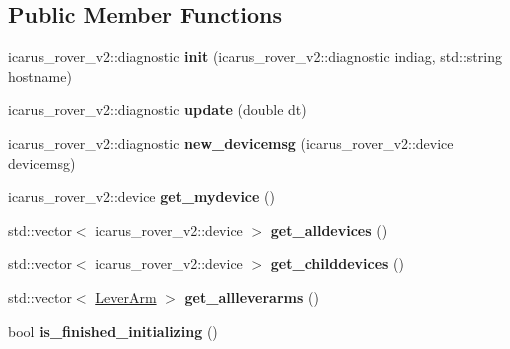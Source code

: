 \subsection*{Public Member Functions}
\begin{DoxyCompactItemize}
\item 
\mbox{\label{classMasterNodeProcess_aa928b2c648d13b4faed375cc15dfc652}} 
icarus\+\_\+rover\+\_\+v2\+::diagnostic {\bfseries init} (icarus\+\_\+rover\+\_\+v2\+::diagnostic indiag, std\+::string hostname)
\item 
\mbox{\label{classMasterNodeProcess_a19cc0bcaddc79b7460ea8944c00f7209}} 
icarus\+\_\+rover\+\_\+v2\+::diagnostic {\bfseries update} (double dt)
\item 
\mbox{\label{classMasterNodeProcess_a6acb9fe8a0baba49a5069e13aba2e373}} 
icarus\+\_\+rover\+\_\+v2\+::diagnostic {\bfseries new\+\_\+devicemsg} (icarus\+\_\+rover\+\_\+v2\+::device devicemsg)
\item 
\mbox{\label{classMasterNodeProcess_adf00ae56ad84a1a8995ab87eaf77da20}} 
icarus\+\_\+rover\+\_\+v2\+::device {\bfseries get\+\_\+mydevice} ()
\item 
\mbox{\label{classMasterNodeProcess_a7e8a12f60c1f8e974abb502d35f94fd0}} 
std\+::vector$<$ icarus\+\_\+rover\+\_\+v2\+::device $>$ {\bfseries get\+\_\+alldevices} ()
\item 
\mbox{\label{classMasterNodeProcess_a971e1d3bdf38bb61a7d57da697222b2c}} 
std\+::vector$<$ icarus\+\_\+rover\+\_\+v2\+::device $>$ {\bfseries get\+\_\+childdevices} ()
\item 
\mbox{\label{classMasterNodeProcess_afc3c8b59d888c2f46c488b1ca09d767a}} 
std\+::vector$<$ \hyperlink{structMasterNodeProcess_1_1LeverArm}{Lever\+Arm} $>$ {\bfseries get\+\_\+allleverarms} ()
\item 
\mbox{\label{classMasterNodeProcess_a04eeaf542321eec99fee97dadc9b8e6b}} 
bool {\bfseries is\+\_\+finished\+\_\+initializing} ()
\item 
\mbox{\label{classMasterNodeProcess_a0796efe447dc2f05459de9b702e65c2d}} 

\end{DoxyCompactItemize}
